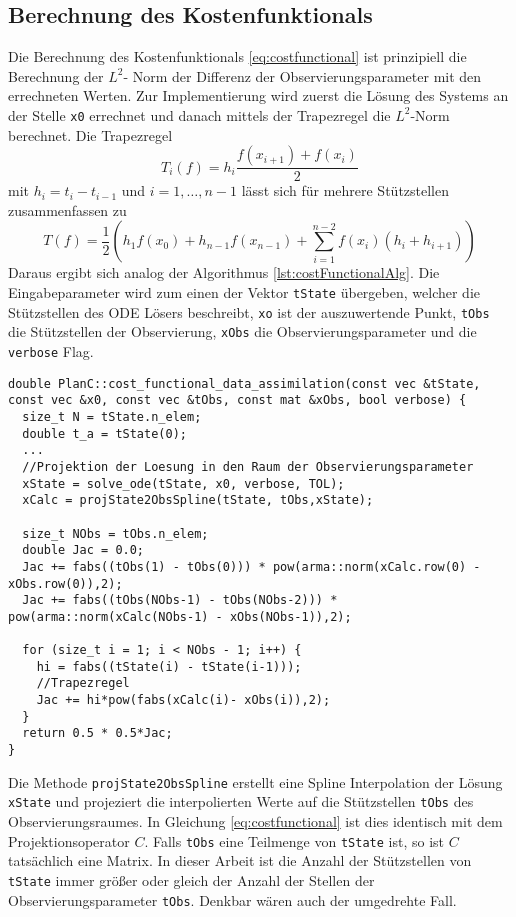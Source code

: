 \subsection{Berechnung des Kostenfunktionals}\label{sec:implementation:costfunctional}
Die Berechnung des Kostenfunktionals \eqref{eq:costfunctional} ist prinzipiell die Berechnung der $L^2$- Norm der Differenz der Observierungsparameter mit den errechneten Werten. Zur Implementierung wird zuerst die Lösung des Systems an der Stelle \texttt{x0} errechnet und danach mittels der Trapezregel die $L^2$-Norm berechnet. Die Trapezregel 
\[
 T_i(f) = h_i \frac{f(x_{i+1})+f(x_i)}{2}
\]
mit $h_i = t_{i}-t_{i-1}$ und $i=1,\ldots,n-1$ lässt sich für mehrere Stützstellen zusammenfassen zu
\[
 T(f) =\frac{1}{2} \left(h_1 f(x_0) + h_{n-1} f(x_{n-1}) + \sum_{i=1}^{n-2} f(x_i)(h_i+h_{i+1})\right)
\]
Daraus ergibt sich analog der Algorithmus \ref{lst:costFunctionalAlg}. Die Eingabeparameter wird zum einen der Vektor \texttt{tState} übergeben, welcher die Stützstellen des ODE Lösers beschreibt, \texttt{xo} ist der auszuwertende Punkt, \texttt{tObs} die Stützstellen der Observierung, \texttt{xObs} die Observierungsparameter und die \texttt{verbose} Flag.
\begin{lstlisting}[caption=Berechnung des Kostenfunktionals,label=lst:costFunctionalAlg]
double PlanC::cost_functional_data_assimilation(const vec &tState, const vec &x0, const vec &tObs, const mat &xObs, bool verbose) {
  size_t N = tState.n_elem;
  double t_a = tState(0);
  ...
  //Projektion der Loesung in den Raum der Observierungsparameter
  xState = solve_ode(tState, x0, verbose, TOL);
  xCalc = projState2ObsSpline(tState, tObs,xState);
  
  size_t NObs = tObs.n_elem;
  double Jac = 0.0;
  Jac += fabs((tObs(1) - tObs(0))) * pow(arma::norm(xCalc.row(0) - xObs.row(0)),2);
  Jac += fabs((tObs(NObs-1) - tObs(NObs-2))) * pow(arma::norm(xCalc(NObs-1) - xObs(NObs-1)),2);

  for (size_t i = 1; i < NObs - 1; i++) {
    hi = fabs((tState(i) - tState(i-1)));
    //Trapezregel
    Jac += hi*pow(fabs(xCalc(i)- xObs(i)),2);
  }
  return 0.5 * 0.5*Jac;
}
\end{lstlisting}
Die Methode \texttt{projState2ObsSpline} erstellt eine Spline Interpolation der Lösung \texttt{xState} und projeziert die interpolierten Werte auf die Stützstellen \texttt{tObs} des Observierungsraumes. In Gleichung \eqref{eq:costfunctional} ist dies identisch mit dem Projektionsoperator $C$. Falls \texttt{tObs} eine Teilmenge von \texttt{tState} ist, so ist $C$ tatsächlich eine Matrix. In dieser Arbeit ist die Anzahl der Stützstellen von \texttt{tState} immer größer oder gleich der Anzahl der Stellen der Observierungsparameter \texttt{tObs}. Denkbar wären auch der umgedrehte Fall.

